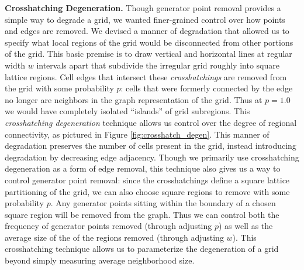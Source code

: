 \documentclass[a4paper,11pt]{article}
\begin{document}

\medskip

\label{subsec:ch_degen}
\noindent \textbf{Crosshatching Degeneration.} Though generator point removal provides a simple way to degrade a grid, we wanted finer-grained control over how points and edges are removed. We devised a manner of degradation that allowed us to specify what local regions of the grid would be disconnected from other portions of the grid. This basic premise is to draw vertical and horizontal lines at regular width $w$ intervals apart that subdivide the irregular grid roughly into square lattice regions. Cell edges that intersect these \textit{crosshatchings} are removed from the grid with some probability $p$: cells that were formerly connected by the edge no longer are neighbors in the graph representation of the grid. Thus at $p=1.0$ we would have completely isolated ``islands'' of grid subregions. This \textit{crosshatching degeneration} technique allows us control over the degree of regional connectivity, as pictured in Figure \ref{fig:crosshatch_degen}. This manner of degradation preserves the number of cells present in the grid, instead introducing degradation by decreasing edge adjacency. Though we primarily use crosshatching degeneration as a form of edge removal, this technique also gives us a way to control generator point removal: since the crosshatchings define a square lattice partitioning of the grid, we can also choose square regions to remove with some probability $p$. Any generator points sitting within the boundary of a chosen square region will be removed from the graph. Thus we can control both the frequency of generator points removed (through adjusting $p$) as well as the average size of the of the regions removed (through adjusting $w$). This crosshatching technique allows us to parameterize the degeneration of a grid beyond simply measuring average neighborhood size.

\end{document}
